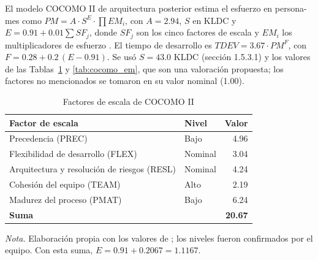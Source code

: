 El modelo COCOMO II de arquitectura posterior estima el esfuerzo en persona-mes como $PM = A \cdot S^{E} \cdot \prod EM_i$, con $A = 2.94$, $S$ en KLDC y $E = 0.91 + 0.01 \sum SF_j$, donde $SF_j$ son los cinco factores de escala y $EM_i$ los multiplicadores de esfuerzo \parencite{boehm2000cocomo}. El tiempo de desarrollo es $TDEV = 3.67 \cdot PM^{F}$, con $F = 0.28 + 0.2 \, (E - 0.91)$. Se usó $S = 43.0$ KLDC (sección 1.5.3.1) y los valores de las Tablas~\ref{tab:cocomo_sf} y \ref{tab:cocomo_em}, que son una valoración propuesta; los factores no mencionados se tomaron en su valor nominal (1.00).

\begin{table}[H]
\caption{Factores de escala de COCOMO II}
\label{tab:cocomo_sf}
\begin{threeparttable}
\begin{tabular}{>{\raggedright\arraybackslash}p{6.4cm} l r}
\toprule
Factor de escala & Nivel & Valor \\
\midrule
Precedencia (PREC) & Bajo & 4.96 \\
Flexibilidad de desarrollo (FLEX) & Nominal & 3.04 \\
Arquitectura y resolución de riesgos (RESL) & Nominal & 4.24 \\
Cohesión del equipo (TEAM) & Alto & 2.19 \\
Madurez del proceso (PMAT) & Bajo & 6.24 \\
\midrule
\textbf{Suma} & & \textbf{20.67} \\
\bottomrule
\end{tabular}
\begin{tablenotes}
\item \textit{Nota.} Elaboración propia con los valores de \textcite{boehm2000cocomo}; los niveles fueron confirmados por el equipo. Con esta suma, $E = 0.91 + 0.2067 = 1.1167$.
\end{tablenotes}
\end{threeparttable}
\end{table}

